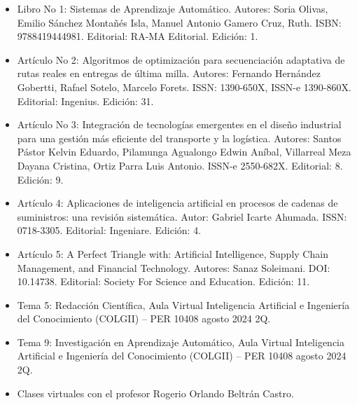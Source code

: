 \documentclass[conference]{IEEEtran}
\begin{document}
	\begin{itemize}
	
	\item Libro No 1: Sistemas de Aprendizaje Automático. Autores: Soria Olivas, Emilio Sánchez Montañés Isla, Manuel Antonio Gamero Cruz, Ruth. ISBN: 9788419444981. Editorial: RA-MA Editorial. Edición: 1.
	
	\item Artículo No 2: Algoritmos de optimización para secuenciación adaptativa de rutas reales en entregas de última milla. Autores: Fernando Hernández Gobertti, Rafael Sotelo, Marcelo Forets. ISSN: 1390-650X, ISSN-e 1390-860X. Editorial: Ingenius. Edición: 31.
	
	\item Artículo No 3: Integración de tecnologías emergentes en el diseño industrial para una gestión más eficiente del transporte y la logística. Autores: Santos Pástor Kelvin Eduardo, Pilamunga Agualongo Edwin Aníbal, Villarreal Meza Dayana Cristina, Ortiz Parra Luis Antonio. ISSN-e 2550-682X. Editorial: 8. Edición: 9.
	
	\item Artículo 4: Aplicaciones de inteligencia artificial en procesos de cadenas de suministros: una revisión sistemática. Autor: Gabriel Icarte Ahumada. ISSN: 0718-3305. Editorial: Ingeniare. Edición: 4.
	
	\item Artículo 5: A Perfect Triangle with: Artificial Intelligence, Supply Chain Management, and Financial Technology. Autores: Sanaz Soleimani. DOI: 10.14738. Editorial: Society For Science and Education. Edición: 11.
	
	\item Tema 5: Redacción Científica, Aula Virtual Inteligencia Artificial e Ingeniería del Conocimiento (COLGII) – PER 10408 agosto 2024 2Q.
	
	\item Tema 9: Investigación en Aprendizaje Automático, Aula Virtual Inteligencia Artificial e Ingeniería del Conocimiento (COLGII) – PER 10408 agosto 2024 2Q.
	
	\item Clases virtuales con el profesor Rogerio Orlando Beltrán Castro.
	
	\end{itemize}
	
	
\end{document}
